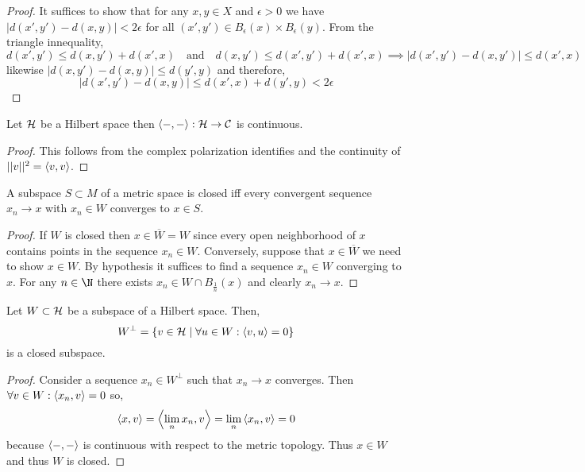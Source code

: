 \documentclass[12pt]{article}
\begin{document}
\begin{proof}
It suffices to show that for any $x,y \in X$ and $\epsilon > 0$ we have $| d(x',y') - d(x,y)| < 2 \epsilon$ for all $(x', y') \in B_\epsilon(x) \times B_\epsilon(y)$. From the triangle innequality,
\[ d(x',y') \le d(x, y') + d(x', x) \quad \text{and} \quad d(x, y') \le d(x', y') + d(x', x) \implies | d(x', y') - d(x, y') | \le d(x', x) \]
likewise $|d(x, y') - d(x, y) | \le d(y', y)$ and therefore,
\[ | d(x', y') - d(x, y) | \le d(x', x) + d(y', y) < 2 \epsilon \]
\end{proof}

\begin{prop}
Let $\mathcal{H}$ be a Hilbert space then $\left< - , - \right> : \mathcal{H} \to \mathcal{C}$ is continuous.
\end{prop}

\begin{proof}
This follows from the complex polarization identifies and the continuity of $|| v ||^2 = \left< v , v \right>$.
\end{proof}

\begin{lemma}
A subspace $S \subset M$ of a metric space is closed iff every convergent sequence $x_n \to x$ with $x_n \in W$ converges to $x \in S$.
\end{lemma}

\begin{proof}
If $W$ is closed then $x \in \overline{W} = W$ since every open neighborhood of $x$ contains points in the sequence $x_n \in W$. Conversely, suppose that $x \in \overline{W}$ we need to show $x \in W$. By hypothesis it suffices to find a sequence $x_n \in W$ converging to $x$. For any $n \in \N$ there exists $x_n \in W \cap B_{\frac{1}{n}}(x)$ and clearly $x_n \to x$.
\end{proof}

\begin{prop}
Let $W \subset \mathcal{H}$ be a subspace of a Hilbert space. Then,
\[ W^\perp = \{ v \in \mathcal{H} \mid \forall u \in W : \left< v , u \right> = 0 \} \]
is a closed subspace.
\end{prop}

\begin{proof}
Consider a sequence $x_n \in W^\perp$ such that $x_n \to x$ converges. Then $\forall v \in W : \left< x_n , v \right> = 0$ so,
\[ \left< x , v \right> = \left< \lim_n x_n , v \right> = \lim_n \left< x_n , v \right> = 0 \]
because $\left< - , - \right>$ is continuous with respect to the metric topology. Thus $x \in W$ and thus $W$ is closed. 
\end{proof}
\end{document}
